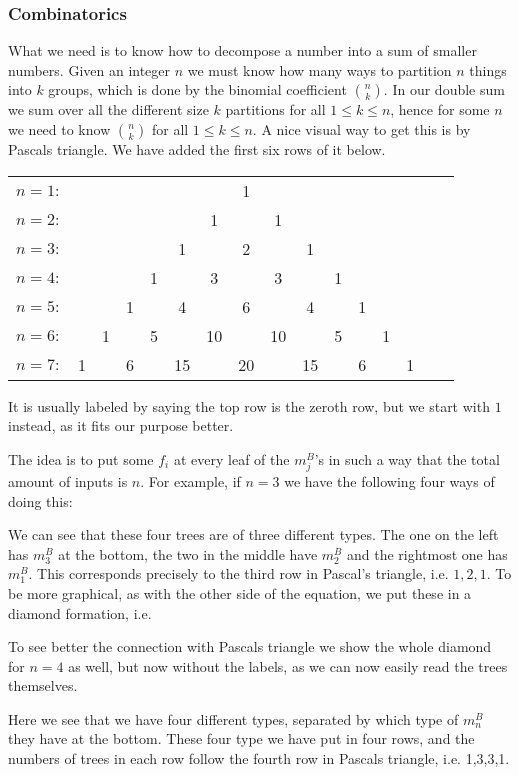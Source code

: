 \subsubsection{Combinatorics}

What we need is to know how to decompose a number into a sum of smaller numbers. Given an integer $n$ we must know how many ways to partition $n$ things into $k$ groups, which is done by the binomial coefficient $\binom{n}{k}$. In our double sum we sum over all the different size $k$ partitions for all $1\leq k\leq n$, hence for some $n$ we need to know $\binom{n}{k}$ for all $1\leq k\leq n$. A nice visual way to get this is by Pascals triangle. We have added the first six rows of it below.

\begin{center}
\begin{tabular}{lccccccccccccccc}
$n=1 \colon$ &&&&&&&1&&&&&&\\
$n=2 \colon$ &&&&&&1&&1&&&&&\\
$n=3 \colon$ &&&&&1&&2&&1&&&&\\
$n=4 \colon$ &&&&1&&3&&3&&1&&&\\
$n=5 \colon$ &&&1&&4&&6&&4&&1&&\\
$n=6 \colon$ &&1&&5&&10&&10&&5&&1&\\
$n=7 \colon$ &1&&6&&15&&20&&15&&6&&1
\end{tabular}
\end{center}

It is usually labeled by saying the top row is the zeroth row, but we start with $1$ instead, as it fits our purpose better. 

The idea is to put some $f_i$ at every leaf of the $m_j^B$'s in such a way that the total amount of inputs is $n$. For example, if $n=3$ we have the following four ways of doing this:


We can see that these four trees are of three different types. The one on the left has $m_3^B$ at the bottom, the two in the middle have $m_2^B$ and the rightmost one has $m_1^B$. This corresponds precisely to the third row in Pascal's triangle, i.e. $1, 2, 1$. To be more graphical, as with the other side of the equation, we put these in a diamond formation, i.e.



To see better the connection with Pascals triangle we show the whole diamond for $n=4$ as well, but now without the labels, as we can now easily read the trees themselves.

Here we see that we have four different types, separated by which type of $m_n^B$ they have at the bottom. These four type we have put in four rows, and the numbers of trees in each row follow the fourth row in Pascals triangle, i.e. 1,3,3,1. 


